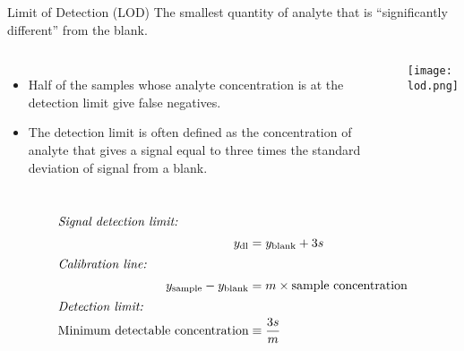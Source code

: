 \documentclass[notes=hide]{beamer}
\begin{document}
\begin{frame}[allowframebreaks]{Limit of Detection (LOD)}
	The smallest quantity of analyte that is ``significantly different''
	from the blank.

	\begin{columns}
		\begin{itemize}
			\item Half of the samples whose analyte concentration is
				at the detection limit give \alert{false
				negatives}.
			\item The detection limit is often defined as the
				concentration of analyte that gives a signal
				equal to three times the standard deviation of
				signal from a blank.
		\end{itemize}
		\begin{center}
			\texttt{[image: lod.png]}
		\end{center}
	\end{columns}

	\framebreak

	\begin{align*}
		\intertext{\textit{Signal detection limit:}}
		y_\text{dl} &= y_\text{blank} + 3s \\
		\intertext{\textit{Calibration line:}}
		y_\text{sample} - y_\text{blank} &= m \times \text{sample
		concentration} \\
		\intertext{\textit{Detection limit:}}
		\text{Minimum detectable concentration} &\equiv \dfrac{3s}{m}
	\end{align*}
\end{frame}

\end{document}
